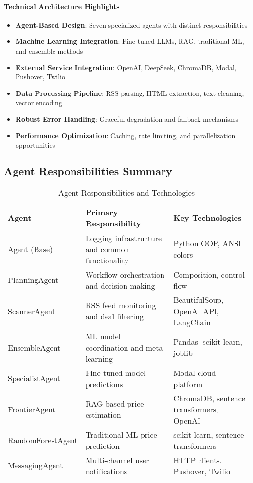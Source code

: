 \paragraph{Technical Architecture Highlights}
\begin{itemize}
\item \textbf{Agent-Based Design}: Seven specialized agents with distinct responsibilities
\item \textbf{Machine Learning Integration}: Fine-tuned LLMs, RAG, traditional ML, and ensemble methods
\item \textbf{External Service Integration}: OpenAI, DeepSeek, ChromaDB, Modal, Pushover, Twilio
\item \textbf{Data Processing Pipeline}: RSS parsing, HTML extraction, text cleaning, vector encoding
\item \textbf{Robust Error Handling}: Graceful degradation and fallback mechanisms
\item \textbf{Performance Optimization}: Caching, rate limiting, and parallelization opportunities
\end{itemize}

\subsection{Agent Responsibilities Summary}

\begin{table}[htbp]
\centering
\begin{tabular}{@{}p{4cm}p{6cm}p{5cm}@{}}
\toprule
\textbf{Agent} & \textbf{Primary Responsibility} & \textbf{Key Technologies} \\
\midrule
Agent (Base) & Logging infrastructure and common functionality & Python OOP, ANSI colors \\
PlanningAgent & Workflow orchestration and decision making & Composition, control flow \\
ScannerAgent & RSS feed monitoring and deal filtering & BeautifulSoup, OpenAI API, LangChain \\
EnsembleAgent & ML model coordination and meta-learning & Pandas, scikit-learn, joblib \\
SpecialistAgent & Fine-tuned model predictions & Modal cloud platform \\
FrontierAgent & RAG-based price estimation & ChromaDB, sentence transformers, OpenAI \\
RandomForestAgent & Traditional ML price prediction & scikit-learn, sentence transformers \\
MessagingAgent & Multi-channel user notifications & HTTP clients, Pushover, Twilio \\
\bottomrule
\end{tabular}
\caption{Agent Responsibilities and Technologies}
\label{tab:agent_summary}
\end{table}

